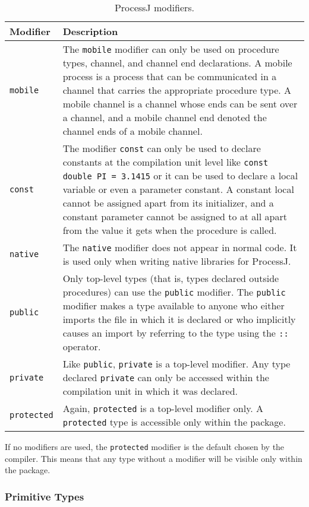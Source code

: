\documentclass[pdflatex,11pt,letter]{article}
\begin{document}
\begin{table}
\begin{center}
\begin{tabular}{lp{10cm}}\hline
Modifier & Description\\ \hline\hline
{\tt mobile} & The {\tt mobile} modifier can only be used on procedure types, channel, and channel end declarations. A mobile process is a process that can be communicated in a channel that carries the appropriate procedure type. A mobile channel is a channel whose ends can be sent over a channel, and a mobile channel end denoted the channel ends of a mobile channel. \\\hline
{\tt const} & The modifier {\tt const} can only be used to declare constants at the compilation unit level like {\tt const double PI = 3.1415} or it can be used to declare a local variable or even a parameter constant. A constant local cannot be assigned apart from its initializer, and a constant parameter cannot be assigned to at all apart from the value it gets when the procedure is called.\\ \hline
{\tt native} & The {\tt native} modifier does not appear in normal code. It is used only when writing native libraries for ProcessJ. \\ \hline 
{\tt public} & Only top-level types (that is, types declared outside procedures) can use the {\tt public} modifier. The {\tt public} modifier makes a type available to anyone who either imports the file in which it is declared or who implicitly causes an import by referring to the type using the {\tt ::} operator.\\ \hline
{\tt private} & Like {\tt public}, {\tt private} is a top-level modifier. Any type declared {\tt private} can only be accessed within the compilation unit in which it was declared.\\ \hline
{\tt protected} & Again, {\tt protected} is a top-level modifier only. A {\tt protected} type is accessible only within the package.\\ \hline
\end{tabular}
\end{center}
\caption{ProcessJ modifiers.}
\label{tab:modifiers}
\end{table}

If no modifiers are used, the {\tt protected} modifier is the default chosen by the compiler. This means that any type without a modifier will be visible only within the package.

\subsubsection{Primitive Types}
\end{document}
